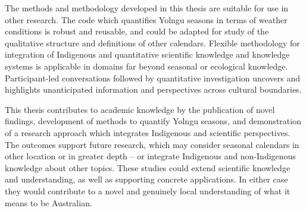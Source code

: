 The methods and methodology developed in this thesis are suitable for use in
other research.  The code which quantifies Yolngu seasons in terms of weather
conditions is robust and reusable, and could be adapted for study of the
qualitative structure and definitions of other calendars.
Flexible methodology for integration of Indigenous and quantitative
scientific knowledge and knowledge systems is applicable in domains far beyond
seasonal or ecological knowledge.  Participant-led conversations followed by
quantitative investigation uncovers and highlights unanticipated information
and perspectives across cultural boundaries.


This thesis contributes to academic knowledge by the publication of novel
findings, development of methods to quantify Yolngu seasons, and demonstration
of a research approach which integrates Indigenous and scientific perspectives.
%
The outcomes support future research, which may consider seasonal calendars in
other location or in greater depth -- or integrate Indigenous and non-Indigenous
knowledge about other topics.  These studies could extend scientific knowledge
and understanding, as well as supporting concrete applications.  In either case
they would contribute to a novel and genuinely local understanding of what it
means to be Australian.

